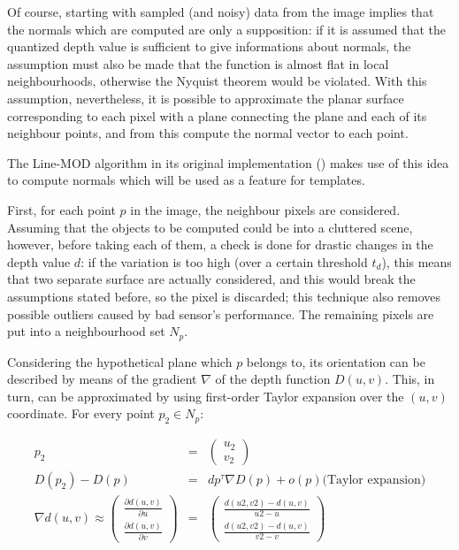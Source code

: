 Of course, starting with sampled (and noisy) data from the image
implies that the normals which are computed are only a supposition:
if it is assumed that the quantized depth value is sufficient to give
informations about normals, the assumption must also be made that the
function is almost flat in local neighbourhoods, otherwise the Nyquist
theorem would be violated. With this assumption, nevertheless, it is
possible to approximate the planar surface corresponding to each pixel
with a plane connecting the plane and each of its neighbour points,
and from this compute the normal vector to each point.

The Line-MOD algorithm in its original implementation
(\cite{linemod-paper}) makes use of this idea to compute normals which will be used
as a feature for templates.

First, for each point $p$ in the image, the neighbour pixels are
considered. Assuming that the objects to be computed could be into a
cluttered scene, however, before taking each of them, a check is done
for drastic changes in the depth value $d$: if the variation is too
high (over a certain threshold $t_d$), this means that two separate
surface are actually considered, and this would break the assumptions
stated before, so the pixel is discarded; this technique also removes
possible outliers caused by bad sensor's performance.  The remaining pixels are put
into a neighbourhood set $N_p$. 

Considering the hypothetical plane which $p$ belongs to, its
orientation can be described by means of the gradient $\nabla$ of the
depth function $D(u,v)$. This, in turn, can be approximated by using first-order
Taylor expansion over the $(u,v)$ coordinate. For every point $p_2 \in N_p$:

\begin{eqnarray}
  p_2 & = & \begin{pmatrix} u_2 \\ v_2 
  \end{pmatrix} \\
  D(p_2)-D(p) & = & dp^{\tau}\nabla D (p) + o (p) \text{(Taylor
    expansion)} \label{eqn:taylor-depth-expansion}\\
  \nabla d(u,v) \approx \begin{pmatrix} \frac{\partial d(u,v)}{\partial u}
    \\ \frac{\partial d(u,v)}{\partial v}
  \end{pmatrix} & = & \begin{pmatrix} \frac{d(u2,v2)-d(u,v)}{u2-u} \\
    \frac{d(u2,v2)-d(u,v)}{v2-v} 
  \end{pmatrix}
\end{eqnarray}

